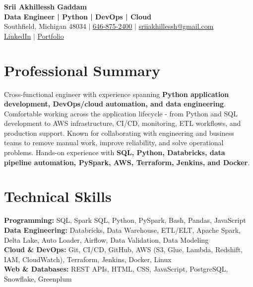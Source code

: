 \documentclass[letterpaper,10pt]{article}
\begin{document}
\fontsize{9.35pt}{10.45pt}\selectfont

\begin{center}
    {\LARGE \textbf{Srii Akhillessh Gaddam}} \\[-1pt]
    \textbf{Data Engineer | Python | DevOps | Cloud} \\[2pt]
    Southfield, Michigan 48034 $|$
    \href{tel:6468752400}{646-875-2400} $|$
    \href{mailto:sriiakhillessh@gmail.com}{sriiakhillessh@gmail.com} \\[1pt]
    \href{https://www.linkedin.com/in/srii-akhiilessh-gaddam-b48668191/}{LinkedIn} $|$
    \href{https://sriiakhillesshg.github.io/portfolio/}{Portfolio}
\end{center}
\vspace{-8pt}

\section{Professional Summary}
\small{Cross-functional engineer with experience spanning \textbf{Python application development, DevOps/cloud automation, and data engineering}. Comfortable working across the application lifecycle - from Python and SQL development to AWS infrastructure, CI/CD, monitoring, ETL workflows, and production support. Known for collaborating with engineering and business teams to remove manual work, improve reliability, and solve operational problems. Hands-on experience with \textbf{SQL, Python, Databricks, data pipeline automation, PySpark, AWS, Terraform, Jenkins, and Docker}.}

\section{Technical Skills}
\small{
\textbf{Programming:} SQL, Spark SQL, Python, PySpark, Bash, Pandas, JavaScript \\
\textbf{Data Engineering:} Databricks, Data Warehouse, ETL/ELT, Apache Spark, Delta Lake, Auto Loader, Airflow, Data Validation, Data Modeling \\
\textbf{Cloud \& DevOps:} Git, CI/CD, GitHub, AWS (S3, Glue, Lambda, Redshift, IAM, CloudWatch), Terraform, Jenkins, Docker, Linux \\
\textbf{Web \& Databases:} REST APIs, HTML, CSS, JavaScript, PostgreSQL, Snowflake, Greenplum
}
\end{document}
